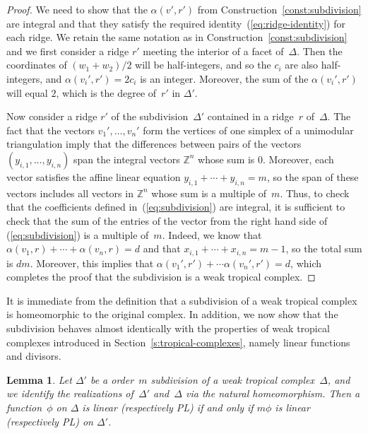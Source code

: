 \documentclass[11pt]{amsart}
\newtheorem{lem}[thm]{Lemma}
\theoremstyle{definition}
\newcommand{\ZZ}{\mathbb Z}
\begin{document}
\begin{proof}
We need to show that the $\alpha(v', r')$ from
Construction~\ref{const:subdivision} are integral and that they satisfy the
required identity~(\ref{eq:ridge-identity}) for each ridge.
We retain the same notation as in Construction~\ref{const:subdivision} and
we first consider a
ridge $r'$ meeting the interior of a facet of~$\Delta$. Then the coordinates of
$(w_1 + w_2)/2$ will be half-integers, and so the $c_i$ are also half-integers,
and $\alpha(v_i', r') = 2c_i$ is an integer. Moreover, the sum of the
$\alpha(v_i', r')$ will equal $2$, which is the degree of~$r'$ in $\Delta'$.

Now consider a ridge $r'$ of the subdivision~$\Delta'$ contained in a ridge~$r$
of~$\Delta$. The fact that the vectors $v_1', \ldots, v_n'$ form the vertices of
one simplex of a unimodular triangulation imply that the differences between
pairs of the vectors $(y_{i,1}, \ldots, y_{i,n})$ span the integral vectors
$\ZZ^{n}$ whose sum is $0$. Moreover, each vector satisfies the affine linear
equation $y_{i,1} + \cdots + y_{i,n} = m$, so the span of these vectors includes
all vectors in $\ZZ^{n}$ whose sum is a multiple of~$m$. Thus, to check that the
coefficients defined in~(\ref{eq:subdivision}) are integral, it is sufficient to
check that the sum of the entries of the vector from the right hand side of
(\ref{eq:subdivision}) is a multiple
of~$m$. Indeed, we know that $\alpha(v_1, r) + \cdots + \alpha(v_n, r) = d$ and
that $x_{i, 1} + \cdots + x_{i,n} = m-1$, so the total sum is $dm$. Moreover,
this implies that $\alpha(v_1', r') + \cdots \alpha(v_n', r') = d$, which
completes the proof that the subdivision is a weak tropical complex.
\end{proof}

It is immediate from the definition that a subdivision of a weak tropical
complex is homeomorphic to the original complex. In addition, we now show that
the subdivision behaves almost identically with the properties of weak tropical
complexes introduced in Section~\ref{s:tropical-complexes}, namely linear
functions and divisors.

\begin{lem}\label{l:subdivide-linear}
Let $\Delta'$ be a order~$m$ subdivision of a weak tropical complex~$\Delta$,
and we identify the realizations of~$\Delta'$ and~$\Delta$ via the natural
homeomorphism. Then a function~$\phi$ on $\Delta$ is linear (respectively PL) if
and only if $m\phi$ is linear (respectively PL) on $\Delta'$.
\end{lem}
\end{document}
